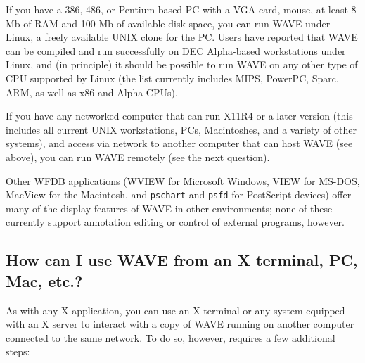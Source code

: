 \documentclass[twoside]{book}
\newcommand{\WAVE}{{\sf WAVE}\xspace}
\begin{document}
If you have a 386, 486, or Pentium-based PC with a VGA card, mouse, at
least 8 Mb of RAM and 100 Mb of available disk space, you can run
\WAVE{} under Linux,
a freely available UNIX clone for the PC.  Users have reported that \WAVE{} can
be compiled and run successfully on DEC Alpha-based workstations under Linux,
and (in principle) it should be possible to run \WAVE{} on any other type of
CPU supported by Linux (the list currently includes MIPS, PowerPC, Sparc, ARM,
as well as x86 and Alpha CPUs).

If you have any networked computer that can run X11R4 or a later version
(this includes all current UNIX workstations, PCs, Macintoshes, and a variety
of other systems), and access via network to another computer that can host
\WAVE{} (see above), you can run \WAVE{} remotely (see the next question).

Other WFDB applications ({\sf WVIEW} for Microsoft Windows, {\sf VIEW} for
MS-DOS, {\sf MacView} for the Macintosh, and {\tt pschart} and {\tt psfd} for
PostScript devices) offer many of the display features of \WAVE{} in other
environments;  none of these currently support annotation editing or control
of external programs, however.

\subsection{How can I use \WAVE{} from an X terminal, PC, Mac, etc.?}

As with any X application, you can use an X terminal or any system equipped
with an X server to interact with a copy of \WAVE{} running on another computer
connected to the same network.  To do so, however, requires a few additional
steps:
\end{document}
